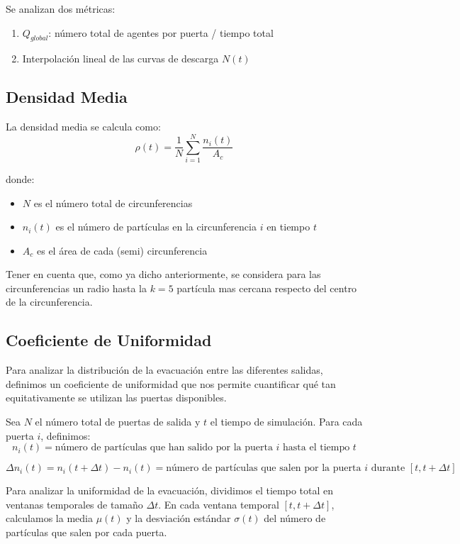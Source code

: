 \documentclass[12pt]{article}
\begin{document}
Se analizan dos métricas:
\begin{enumerate}
    \item $Q_{global}$: número total de agentes por puerta / tiempo total
    \item Interpolación lineal de las curvas de descarga $N(t)$
\end{enumerate}

\subsection{Densidad Media}
La densidad media se calcula como:
\begin{equation}
\rho(t) = \frac{1}{N} \sum_{i=1}^{N} \frac{n_i(t)}{A_c}
\end{equation}

donde:
\begin{itemize}
    \item $N$ es el número total de circunferencias
    \item $n_i(t)$ es el número de partículas en la circunferencia $i$ en tiempo $t$
    \item $A_c$ es el área de cada (semi) circunferencia
\end{itemize}
Tener en cuenta que, como ya dicho anteriormente, se considera para las circunferencias un radio hasta la $k=5$ partícula mas cercana respecto del centro de la circunferencia.

\subsection{Coeficiente de Uniformidad}

Para analizar la distribución de la evacuación entre las diferentes salidas, definimos un coeficiente de uniformidad que nos permite cuantificar qué tan equitativamente se utilizan las puertas disponibles. 

Sea $N$ el número total de puertas de salida y $t$ el tiempo de simulación. Para cada puerta $i$, definimos:
\[
n_i(t) = \text{número de partículas que han salido por la puerta } i \text{ hasta el tiempo } t
\]

\[
\Delta n_i(t) = n_i(t + \Delta t) - n_i(t) = \text{número de partículas que salen por la puerta } i \text{ durante } [t, t+\Delta t]
\]

Para analizar la uniformidad de la evacuación, dividimos el tiempo total en ventanas temporales de tamaño $\Delta t$. En cada ventana temporal $[t, t+\Delta t]$, calculamos la media $\mu(t)$ y la desviación estándar $\sigma(t)$ del número de partículas que salen por cada puerta.
\end{document}
